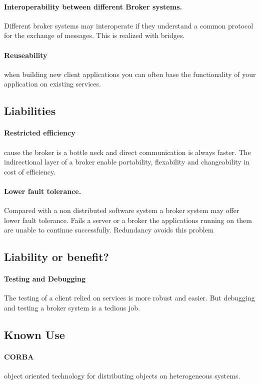 \documentclass[a4paper,11pt,twocolumn]{report}
\begin{document}
    \paragraph{Interoperability between different Broker systems.} Different
    broker systems may interoperate if they understand a common protocol for
    the exchange of messages. This is realized with bridges.
    \paragraph{Reuseability} when building new client applications you can
    often base the functionality of your application on existing services.
    \subsection{Liabilities}
    \paragraph{Restricted efficiency} cause the broker is a bottle neck and
    direct communication is always faster. The indirectional layer of a broker
    enable portability, flexability and changeability in cost of efficiency.
    \paragraph{Lower fault tolerance.} Compared with a non distributed software
    system a broker system may offer lower fault tolerance. Fails a server or a
    broker the applications running on them are unable to continue
    successfully. Redundancy avoids this problem
    \subsection{Liability or benefit?}
    \paragraph{Testing and Debugging} The testing of a client relied on
    services is more robust and easier. But debugging and testing a broker
    system is a tedious job.
    \subsection{Known Use}
    \paragraph{CORBA} object oriented technology for distributing objects on
    heterogeneous systems.
\end{document}
